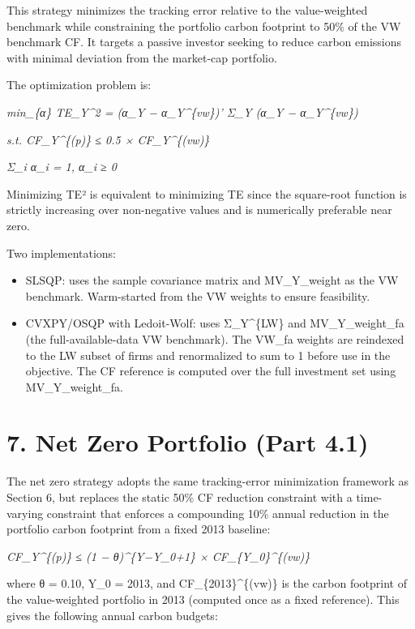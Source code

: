 \documentclass[
  11pt,
]{article}
\begin{document}
This strategy minimizes the tracking error relative to the
value-weighted benchmark while constraining the portfolio carbon
footprint to 50\% of the VW benchmark CF. It targets a passive investor
seeking to reduce carbon emissions with minimal deviation from the
market-cap portfolio.

The optimization problem is:

\emph{min\_\{α\} TE\_Y\^{}2 = (α\_Y − α\_Y\^{}\{vw\})' Σ\_Y (α\_Y −
α\_Y\^{}\{vw\})}

\emph{s.t. CF\_Y\^{}\{(p)\} ≤ 0.5 × CF\_Y\^{}\{(vw)\}}

\emph{Σ\_i α\_i = 1, α\_i ≥ 0}

Minimizing TE² is equivalent to minimizing TE since the square-root
function is strictly increasing over non-negative values and is
numerically preferable near zero.

Two implementations:

\begin{itemize}
\item
  SLSQP: uses the sample covariance matrix and MV\_Y\_weight as the VW
  benchmark. Warm-started from the VW weights to ensure feasibility.
\item
  CVXPY/OSQP with Ledoit-Wolf: uses Σ\_Y\^{}\{LW\} and MV\_Y\_weight\_fa
  (the full-available-data VW benchmark). The VW\_fa weights are
  reindexed to the LW subset of firms and renormalized to sum to 1
  before use in the objective. The CF reference is computed over the
  full investment set using MV\_Y\_weight\_fa.
\end{itemize}

\hypertarget{net-zero-portfolio-part-4.1}{%
\section{7. Net Zero Portfolio (Part
4.1)}\label{net-zero-portfolio-part-4.1}}

The net zero strategy adopts the same tracking-error minimization
framework as Section 6, but replaces the static 50\% CF reduction
constraint with a time-varying constraint that enforces a compounding
10\% annual reduction in the portfolio carbon footprint from a fixed
2013 baseline:

\emph{CF\_Y\^{}\{(p)\} ≤ (1 − θ)\^{}\{Y−Y\_0+1\} ×
CF\_\{Y\_0\}\^{}\{(vw)\}}

where θ = 0.10, Y\_0 = 2013, and CF\_\{2013\}\^{}\{(vw)\} is the carbon
footprint of the value-weighted portfolio in 2013 (computed once as a
fixed reference). This gives the following annual carbon budgets:
\end{document}
